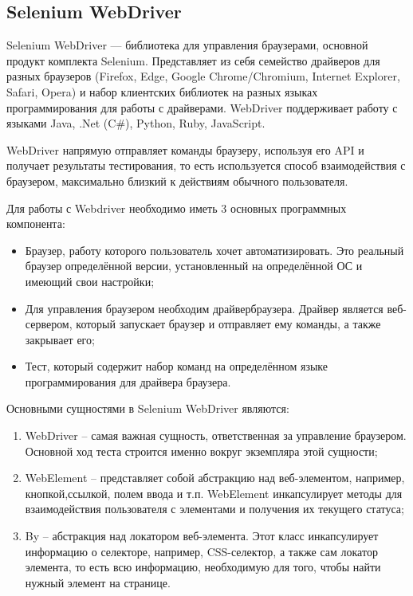 \documentclass[a4paper]{article}
\begin{document}
    \subsection{Selenium WebDriver}
    Selenium WebDriver — библиотека для управления браузерами, основной продукт комплекта Selenium. Представляет из себя семейство драйверов для разных браузеров (Firefox, Edge, Google Chrome/Chromium, Internet Explorer, Safari, Opera) и набор клиентских библиотек на разных языках программирования для работы с драйверами. WebDriver поддерживает работу с языками Java, .Net (C\#), Python, Ruby, JavaScript. \par
    WebDriver напрямую отправляет команды браузеру, используя его API и получает результаты тестирования, то есть используется способ взаимодействия с браузером, максимально близкий к действиям обычного пользователя. \par
    Для работы с Webdriver необходимо иметь 3 основных программных компонента:
    \begin{itemize}
        \item Браузер, работу которого пользователь хочет автоматизировать. Это реальный браузер определённой версии, установленный на определённой ОС и имеющий свои настройки;
        \item Для управления браузером необходим драйвербраузера. Драйвер является веб-сервером, который запускает браузер и отправляет ему команды, а также закрывает его;
        \item Тест, который содержит набор команд на определённом языке программирования для драйвера браузера.
    \end{itemize}
    Основными сущностями в Selenium WebDriver являются:
    \begin{enumerate}
        \item WebDriver – самая важная сущность, ответственная за управление браузером. Основной ход теста строится именно вокруг экземпляра этой сущности;
        \item WebElement – представляет собой абстракцию над веб-элементом, например, кнопкой,ссылкой, полем ввода и т.п. WebElement инкапсулирует методы для взаимодействия пользователя с элементами и получения их текущего статуса;
        \item By – абстракция над локатором веб-элемента. Этот класс инкапсулирует информацию о селекторе, например, CSS-селектор, а также сам локатор элемента, то есть всю информацию, необходимую для того, чтобы найти нужный элемент на странице.
    \end{enumerate}
\end{document}
